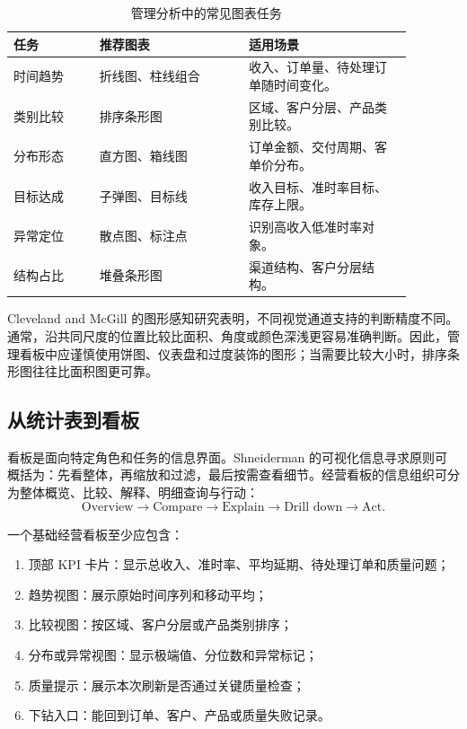 \begin{table}[htbp]
\centering
\caption{管理分析中的常见图表任务}
\begin{tabular}{P{0.19\linewidth}P{0.33\linewidth}P{0.36\linewidth}}
\toprule
{}
任务 & 推荐图表 & 适用场景\\
\midrule

时间趋势 & 折线图、柱线组合 & 收入、订单量、待处理订单随时间变化。\\
类别比较 & 排序条形图 & 区域、客户分层、产品类别比较。\\
分布形态 & 直方图、箱线图 & 订单金额、交付周期、客单价分布。\\
目标达成 & 子弹图、目标线 & 收入目标、准时率目标、库存上限。\\
异常定位 & 散点图、标注点 & 识别高收入低准时率对象。\\
结构占比 & 堆叠条形图 & 渠道结构、客户分层结构。\\
\bottomrule
\end{tabular}
\end{table}

Cleveland and McGill 的图形感知研究表明，不同视觉通道支持的判断精度不同。通常，沿共同尺度的位置比较比面积、角度或颜色深浅更容易准确判断。因此，管理看板中应谨慎使用饼图、仪表盘和过度装饰的图形；当需要比较大小时，排序条形图往往比面积图更可靠。

\subsection{从统计表到看板}

看板是面向特定角色和任务的信息界面。Shneiderman 的可视化信息寻求原则可概括为：先看整体，再缩放和过滤，最后按需查看细节。经营看板的信息组织可分为整体概览、比较、解释、明细查询与行动：
\[
\text{Overview}
\rightarrow
\text{Compare}
\rightarrow
\text{Explain}
\rightarrow
\text{Drill down}
\rightarrow
\text{Act}.
\]

一个基础经营看板至少应包含：
\begin{enumerate}
  \item 顶部 KPI 卡片：显示总收入、准时率、平均延期、待处理订单和质量问题；
  \item 趋势视图：展示原始时间序列和移动平均；
  \item 比较视图：按区域、客户分层或产品类别排序；
  \item 分布或异常视图：显示极端值、分位数和异常标记；
  \item 质量提示：展示本次刷新是否通过关键质量检查；
  \item 下钻入口：能回到订单、客户、产品或质量失败记录。
\end{enumerate}

